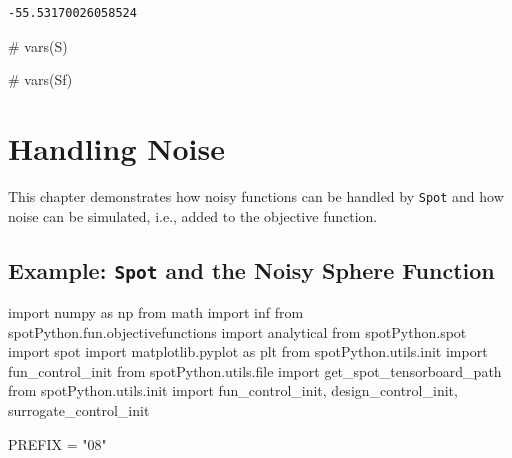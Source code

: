 \documentclass[
  letterpaper,
  DIV=11,
  numbers=noendperiod]{scrreprt}
\newenvironment{Shaded}{\begin{snugshade}}{\end{snugshade}}
\newcommand{\BuiltInTok}[1]{\textcolor[rgb]{0.00,0.23,0.31}{#1}}
\newcommand{\CommentTok}[1]{\textcolor[rgb]{0.37,0.37,0.37}{#1}}
\newcommand{\ImportTok}[1]{\textcolor[rgb]{0.00,0.46,0.62}{#1}}
\newcommand{\NormalTok}[1]{\textcolor[rgb]{0.00,0.23,0.31}{#1}}
\newcommand{\OperatorTok}[1]{\textcolor[rgb]{0.37,0.37,0.37}{#1}}
\newcommand{\StringTok}[1]{\textcolor[rgb]{0.13,0.47,0.30}{#1}}
\begin{document}
\begin{verbatim}
-55.53170026058524
\end{verbatim}

\begin{Shaded}
\begin{Highlighting}[]
\CommentTok{\# vars(S)}
\end{Highlighting}
\end{Shaded}

\begin{Shaded}
\begin{Highlighting}[]
\CommentTok{\# vars(Sf)}
\end{Highlighting}
\end{Shaded}

\chapter{Handling Noise}\label{sec-noise}

This chapter demonstrates how noisy functions can be handled by
\texttt{Spot} and how noise can be simulated, i.e., added to the
objective function.

\section{\texorpdfstring{Example: \texttt{Spot} and the Noisy Sphere
Function}{Example: Spot and the Noisy Sphere Function}}\label{example-spot-and-the-noisy-sphere-function}

\begin{Shaded}
\begin{Highlighting}[]
\ImportTok{import}\NormalTok{ numpy }\ImportTok{as}\NormalTok{ np}
\ImportTok{from}\NormalTok{ math }\ImportTok{import}\NormalTok{ inf}
\ImportTok{from}\NormalTok{ spotPython.fun.objectivefunctions }\ImportTok{import}\NormalTok{ analytical}
\ImportTok{from}\NormalTok{ spotPython.spot }\ImportTok{import}\NormalTok{ spot}
\ImportTok{import}\NormalTok{ matplotlib.pyplot }\ImportTok{as}\NormalTok{ plt}
\ImportTok{from}\NormalTok{ spotPython.utils.init }\ImportTok{import}\NormalTok{ fun\_control\_init}
\ImportTok{from}\NormalTok{ spotPython.utils.}\BuiltInTok{file} \ImportTok{import}\NormalTok{ get\_spot\_tensorboard\_path}
\ImportTok{from}\NormalTok{ spotPython.utils.init }\ImportTok{import}\NormalTok{ fun\_control\_init, design\_control\_init, surrogate\_control\_init}

\NormalTok{PREFIX }\OperatorTok{=} \StringTok{"08"}
\end{Highlighting}
\end{Shaded}
\end{document}
